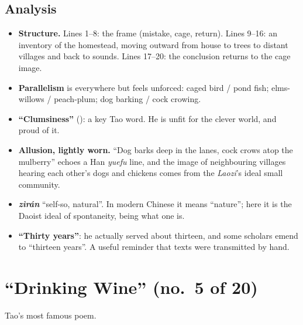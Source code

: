 \subsection{Analysis}
\begin{itemize}
  \item \textbf{Structure.} Lines 1--8: the frame (mistake, cage, return). Lines 9--16: an
        inventory of the homestead, moving outward from house to trees to distant villages
        and back to sounds. Lines 17--20: the conclusion returns to the cage image.
  \item \textbf{Parallelism} is everywhere but feels unforced: caged bird / pond fish;
        elms-willows / peach-plum; dog barking / cock crowing.
  \item \textbf{``Clumsiness''} (): a key Tao word. He is unfit for the clever
        world, and proud of it.
  \item \textbf{Allusion, lightly worn.} ``Dog barks deep in the lanes, cock crows atop
        the mulberry'' echoes a Han \emph{yuefu} line, and the image of neighbouring
        villages hearing each other's dogs and chickens comes from the \emph{Laozi}'s
        ideal small community.
  \item \textbf{ \emph{zìrán}} ``self-so, natural''. In modern Chinese it means
        ``nature''; here it is the Daoist ideal of spontaneity, being what one is.
  \item \textbf{``Thirty years''}: he actually served about thirteen, and some scholars
        emend to  ``thirteen years''. A useful reminder that texts were transmitted by hand.
\end{itemize}

\section{``Drinking Wine''  (no.\ 5 of 20)}

Tao's most famous poem.


